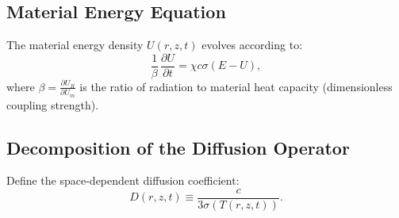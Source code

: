 \documentclass[11pt]{article}
\begin{document}
\subsection{Material Energy Equation}

The material energy density $U(r,z,t)$ evolves according to:
\begin{equation}
\frac{1}{\beta}\,\frac{\partial U}{\partial t}
=
\chi c\sigma(E - U),
\label{eq:U_continuous}
\end{equation}
where $\beta = \frac{\partial U_R}{\partial U_m}$ is the ratio of radiation to material heat capacity (dimensionless coupling strength).

\subsection{Decomposition of the Diffusion Operator}

Define the space-dependent diffusion coefficient:
\begin{equation}
D(r,z,t)
\equiv
\frac{c}{3\sigma(T(r,z,t))}.
\end{equation}
\end{document}
